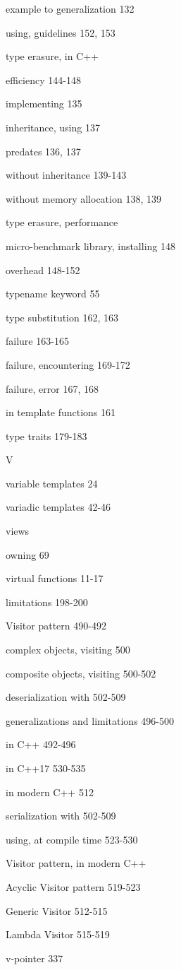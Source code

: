 example to generalization 132

using, guidelines 152, 153

type erasure, in C++

efficiency 144-148

implementing 135

inheritance, using 137

predates 136, 137

without inheritance 139-143

without memory allocation 138, 139

type erasure, performance

micro-benchmark library, installing 148

overhead 148-152

typename keyword 55

type substitution 162, 163

failure 163-165

failure, encountering 169-172

failure, error 167, 168

in template functions 161

type traits 179-183

V

variable templates 24

variadic templates 42-46

views

owning 69

virtual functions 11-17

limitations 198-200

Visitor pattern 490-492

complex objects, visiting 500

composite objects, visiting 500-502

deserialization with 502-509

generalizations and limitations 496-500

in C++ 492-496

in C++17 530-535

in modern C++ 512

serialization with 502-509

using, at compile time 523-530

Visitor pattern, in modern C++

Acyclic Visitor pattern 519-523

Generic Visitor 512-515

Lambda Visitor 515-519

v-pointer 337


